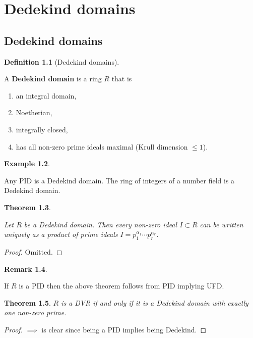 \documentclass[10pt,]{book}
\newcommand{\terminology}[1]{\textbf{#1}}
\theoremstyle{plain}
\newtheorem{theorem}{Theorem}[section]
\theoremstyle{definition}
\newtheorem{definition}[theorem]{Definition}
\newtheorem{example}[theorem]{Example}
\newtheorem{remark}[theorem]{Remark}
\begin{document}
\chapter[Dedekind domains]{Dedekind domains}\label{chap-dedekind}
\typeout{************************************************}
\typeout{************************************************}
\section[Dedekind domains]{Dedekind domains}\label{sec-dedekind}
\begin{definition}[Dedekind domains]\label{definition-9}

            A \terminology{Dedekind domain} is a ring \(R\) that is
            \begin{enumerate}
\item{}an integral domain,\item{}Noetherian,\item{}integrally closed,\item{}has all non-zero prime ideals maximal (Krull dimension \(\le 1\)).\end{enumerate}
\end{definition}
\begin{example}\label{example-8}

            Any PID is a Dedekind domain.\newline{}
            The ring of integers of a number field is a Dedekind domain.
          \end{example}
\begin{theorem}\label{theorem-3}

            Let \(R\) be a Dedekind domain.
            Then every non-zero ideal \(I \subset R\) can be written uniquely as a product of prime ideals \(I = p_1^{\alpha_1} \cdots p_r^{\alpha_r}\).
          \end{theorem}
\begin{proof}

            Omitted.
          \end{proof}
\begin{remark}\label{remark-9}

            If \(R\) is a PID then the above theorem  follows from PID implying UFD.
          \end{remark}
\begin{theorem}\label{theorem-4}
\(R\) is a DVR if and only if it is a Dedekind domain with exactly one non-zero prime.
          \end{theorem}
\begin{proof}
\(\implies\) is clear since being a PID implies being Dedekind.\newline{}\end{proof}
\typeout{************************************************}
\typeout{************************************************}
\end{document}
